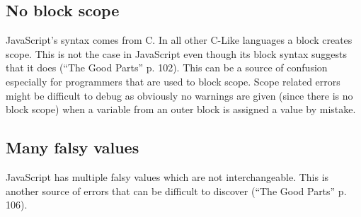 		\subsection{No block scope}
			JavaScript’s syntax comes from C. In all other C-Like languages a block creates scope. This is not the case in JavaScript even though its block syntax suggests that it does (“The Good Parts” p. 102). This can be a source of confusion especially for programmers that are used to block scope. Scope related errors might be difficult to debug as obviously no warnings are given (since there is no block scope) when a variable from an outer block is assigned a value by mistake.

		\subsection{Many falsy values}
			JavaScript has multiple falsy values which are not interchangeable. This is another source of errors that can be difficult to discover (“The Good Parts” p. 106).

